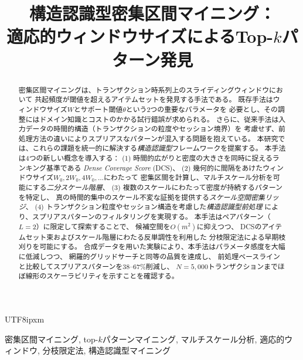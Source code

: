 \documentclass[conference]{IEEEtran}
\begin{document}
\begin{CJK}{UTF8}{ipxm}

\title{構造認識型密集区間マイニング：\\適応的ウィンドウサイズによるTop-$k$パターン発見}

\author{
}

\maketitle

\begin{abstract}
密集区間マイニングは、トランザクション時系列上のスライディングウィンドウにおいて
共起頻度が閾値を超えるアイテムセットを発見する手法である。
既存手法はウィンドウサイズ$W$とサポート閾値$\theta$という2つの重要なパラメータを
必要とし、その調整にはドメイン知識とコストのかかる試行錯誤が求められる。
さらに、従来手法は入力データの時間的構造（トランザクションの粒度やセッション境界）を
考慮せず、前処理方法の違いによりスプリアスなパターンが混入する問題を抱えている。
本研究では、これらの課題を統一的に解決する\emph{構造認識型}フレームワークを提案する。
本手法は4つの新しい概念を導入する：
(1) 時間的広がりと密度の大きさを同時に捉えるランキング基準である
\emph{Dense Coverage Score} (DCS)、
(2) 幾何的に間隔をあけたウィンドウサイズ$W_0, 2W_0, 4W_0, \ldots$にわたって
密集区間を計算し、マルチスケール分析を可能にする\emph{二分スケール階層}、
(3) 複数のスケールにわたって密度が持続するパターンを特定し、
真の時間的集中のスケール不変な証拠を提供する\emph{スケール空間密集リッジ}、
(4) トランザクション粒度やセッション構造を考慮した\emph{構造認識型前処理}
により、スプリアスパターンのフィルタリングを実現する。
本手法はペアパターン（$L{=}2$）に限定して探索することで、
候補空間を$O(m^2)$に抑えつつ、
DCSのアイテムセット束およびスケール階層にわたる反単調性を利用した
分枝限定法による早期枝刈りを可能にする。
合成データを用いた実験により、本手法はパラメータ感度を大幅に低減しつつ、
網羅的グリッドサーチと同等の品質を達成し、
前処理ベースラインと比較してスプリアスパターンを38--67\%削減し、
$N = 5{,}000$トランザクションまでほぼ線形のスケーラビリティを示すことを確認する。
\end{abstract}

\begin{IEEEkeywords}
密集区間マイニング, top-$k$パターンマイニング, マルチスケール分析,
適応的ウィンドウ, 分枝限定法, 構造認識型マイニング
\end{IEEEkeywords}


\end{CJK}
\end{document}
